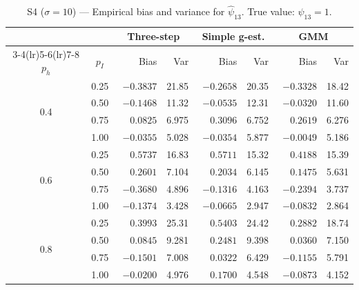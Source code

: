 \documentclass[12pt]{article}
\begin{document}
\begin{table}[htbp]
\centering
\caption{S4 ($\sigma=10$) --- Empirical bias and variance for $\hat\psi_{13}$.
         True value: $\psi_{13}=1$.}
\label{tab:s4_psi13}
\small
\begin{tabular}{cc rr rr rr}
\toprule
& & \multicolumn{2}{c}{Three-step} & \multicolumn{2}{c}{Simple g-est.} & \multicolumn{2}{c}{GMM} \\
\cmidrule(lr){3-4}\cmidrule(lr){5-6}\cmidrule(lr){7-8}
$p_h$ & $p_I$ & Bias & Var & Bias & Var & Bias & Var \\
\midrule
\multirow{4}{*}{0.4}
 & 0.25 & $-0.3837$ & 21.85 & $-0.2658$ & 20.35 & $-0.3328$ & 18.42 \\
 & 0.50 & $-0.1468$ & 11.32 & $-0.0535$ & 12.31 & $-0.0320$ & 11.60 \\
 & 0.75 & $\phantom{-}0.0825$ & 6.975 & $\phantom{-}0.3096$ & 6.752 & $\phantom{-}0.2619$ & 6.276 \\
 & 1.00 & $-0.0355$ & 5.028 & $-0.0354$ & 5.877 & $-0.0049$ & 5.186 \\
\midrule
\multirow{4}{*}{0.6}
 & 0.25 & $\phantom{-}0.5737$ & 16.83 & $\phantom{-}0.5711$ & 15.32 & $\phantom{-}0.4188$ & 15.39 \\
 & 0.50 & $\phantom{-}0.2601$ & 7.104 & $\phantom{-}0.2034$ & 6.145 & $\phantom{-}0.1475$ & 5.631 \\
 & 0.75 & $-0.3680$ & 4.896 & $-0.1316$ & 4.163 & $-0.2394$ & 3.737 \\
 & 1.00 & $-0.1374$ & 3.428 & $-0.0665$ & 2.947 & $-0.0832$ & 2.864 \\
\midrule
\multirow{4}{*}{0.8}
 & 0.25 & $\phantom{-}0.3993$ & 25.31 & $\phantom{-}0.5403$ & 24.42 & $\phantom{-}0.2882$ & 18.74 \\
 & 0.50 & $\phantom{-}0.0845$ & 9.281 & $\phantom{-}0.2481$ & 9.398 & $\phantom{-}0.0360$ & 7.150 \\
 & 0.75 & $-0.1501$ & 7.008 & $\phantom{-}0.0322$ & 6.429 & $-0.1155$ & 5.791 \\
 & 1.00 & $-0.0200$ & 4.976 & $\phantom{-}0.1700$ & 4.548 & $-0.0873$ & 4.152 \\
\bottomrule
\end{tabular}
\end{table}
\end{document}
